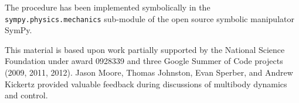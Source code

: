 \documentclass[smallcondensed,final]{svjour3}                     %
\begin{document}

The procedure has been implemented
symbolically in the \texttt{sympy.physics.mechanics} sub-module of the open
source symbolic manipulator SymPy\cite{SymPy2012}.

\begin{acknowledgements}
 This material is based upon work partially supported by the National Science
 Foundation under award 0928339 and three Google Summer of Code projects (2009,
 2011, 2012).  Jason Moore, Thomas Johnston, Evan Sperber, and Andrew Kickertz
 provided valuable feedback during discussions of multibody dynamics and
 control.
\end{acknowledgements}

\appendix
\end{document}
